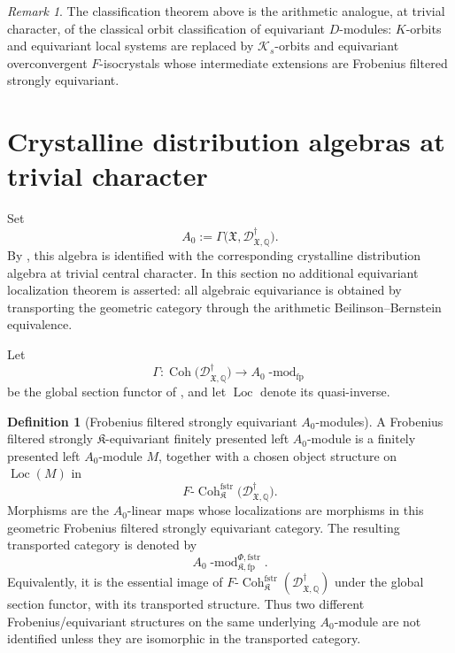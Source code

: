 \documentclass[11pt]{amsart}
\theoremstyle{plain}
\theoremstyle{definition}
\newtheorem{definition}{Definition}[section]
\theoremstyle{remark}
\newtheorem{remark}{Remark}[section]
\newcommand{\Coh}{\operatorname{Coh}}
\newcommand{\fstr}{\mathrm{fstr}}
\newcommand{\Loc}{\operatorname{Loc}}
\begin{document}
\begin{remark}
\label{rem:classification-interpretation}
The classification theorem above is the arithmetic analogue, at trivial
character, of the classical orbit classification of equivariant \(D\)-modules:
\(K\)-orbits and equivariant local systems are replaced by \(\mathcal K_s\)-orbits
and equivariant overconvergent \(F\)-isocrystals whose intermediate extensions are Frobenius filtered strongly equivariant.
\end{remark}

\section{Crystalline distribution algebras at trivial character}
\label{sec:distributions}

Set
\[
  A_0:=
  \Gamma\bigl(\mathfrak X,
  \mathscr D^\dagger_{\mathfrak X,\mathbb Q}\bigr).
\]
By , this algebra is identified with the corresponding
crystalline distribution algebra at trivial central character.  In this
section no additional equivariant localization theorem is asserted: all
algebraic equivariance is obtained by transporting the geometric category
through the arithmetic Beilinson--Bernstein equivalence.

Let
\[
  \Gamma:
  \Coh\bigl(\mathscr D^\dagger_{\mathfrak X,\mathbb Q}\bigr)
  \longrightarrow
  A_0\operatorname{-mod}_{\mathrm{fp}}
\]
be the global section functor of , and let \(\Loc\)
denote its quasi-inverse.

\begin{definition}[Frobenius filtered strongly equivariant \(A_0\)-modules]
\label{def:strong-equivariant-A0-modules}
A Frobenius filtered strongly \(\mathfrak K\)-equivariant finitely presented
left \(A_0\)-module is a finitely presented left \(A_0\)-module \(M\), together
with a chosen object structure on \(\Loc(M)\) in
\[
  F\text{-}\Coh^{\fstr}_{\mathfrak K}
  \bigl(\mathscr D^\dagger_{\mathfrak X,\mathbb Q}\bigr).
\]
Morphisms are the \(A_0\)-linear maps whose localizations are morphisms in this
geometric Frobenius filtered strongly equivariant category.  The resulting
transported category is denoted by
\[
  A_0\operatorname{-mod}^{\Phi,\fstr}_{\mathfrak K,\mathrm{fp}}.
\]
Equivalently, it is the essential image of
\(F\text{-}\Coh^{\fstr}_{\mathfrak K}(\mathscr D^\dagger_{\mathfrak X,\mathbb Q})\)
under the global section functor, with its transported structure.  Thus two
different Frobenius/equivariant structures on the same underlying
\(A_0\)-module are not identified unless they are isomorphic in the transported
category.
\end{definition}
\end{document}
